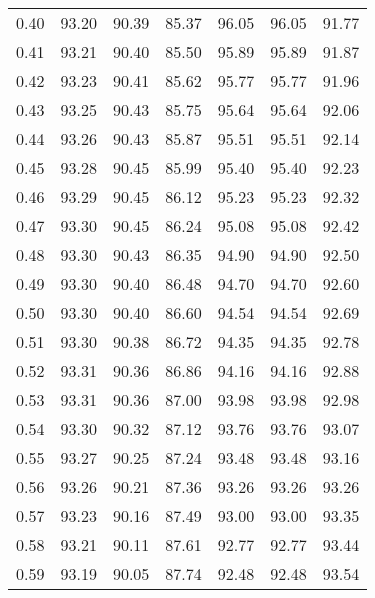 \begin{tabular}{|c|c|c|c|c|c|c|}
      0.40 &     93.20 &     90.39 &      85.37 &   96.05 &      96.05 &         91.77 \\
      0.41 &     93.21 &     90.40 &      85.50 &   95.89 &      95.89 &         91.87 \\
      0.42 &     93.23 &     90.41 &      85.62 &   95.77 &      95.77 &         91.96 \\
      0.43 &     93.25 &     90.43 &      85.75 &   95.64 &      95.64 &         92.06 \\
      0.44 &     93.26 &     90.43 &      85.87 &   95.51 &      95.51 &         92.14 \\
      0.45 &     93.28 &     90.45 &      85.99 &   95.40 &      95.40 &         92.23 \\
      0.46 &     93.29 &     90.45 &      86.12 &   95.23 &      95.23 &         92.32 \\
      0.47 &     93.30 &     90.45 &      86.24 &   95.08 &      95.08 &         92.42 \\
      0.48 &     93.30 &     90.43 &      86.35 &   94.90 &      94.90 &         92.50 \\
      0.49 &     93.30 &     90.40 &      86.48 &   94.70 &      94.70 &         92.60 \\
      0.50 &     93.30 &     90.40 &      86.60 &   94.54 &      94.54 &         92.69 \\
      0.51 &     93.30 &     90.38 &      86.72 &   94.35 &      94.35 &         92.78 \\
      0.52 &     93.31 &     90.36 &      86.86 &   94.16 &      94.16 &         92.88 \\
      0.53 &     93.31 &     90.36 &      87.00 &   93.98 &      93.98 &         92.98 \\
      0.54 &     93.30 &     90.32 &      87.12 &   93.76 &      93.76 &         93.07 \\
      0.55 &     93.27 &     90.25 &      87.24 &   93.48 &      93.48 &         93.16 \\
      0.56 &     93.26 &     90.21 &      87.36 &   93.26 &      93.26 &         93.26 \\
      0.57 &     93.23 &     90.16 &      87.49 &   93.00 &      93.00 &         93.35 \\
      0.58 &     93.21 &     90.11 &      87.61 &   92.77 &      92.77 &         93.44 \\
      0.59 &     93.19 &     90.05 &      87.74 &   92.48 &      92.48 &         93.54 \\

\end{tabular}
